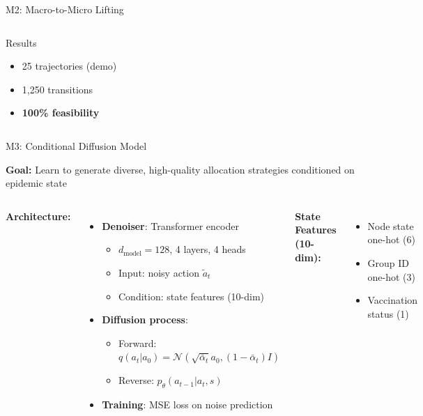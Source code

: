 \documentclass[aspectratio=169]{beamer}
\begin{document}
\begin{frame}{M2: Macro-to-Micro Lifting}
\begin{columns}
\vspace{0.5em}
\begin{block}{Results}
\begin{itemize}
    \item 25 trajectories (demo)
    \item 1,250 transitions
    \item \textbf{100\% feasibility}
\end{itemize}
\end{block}

\end{columns}

\end{frame}

\begin{frame}{M3: Conditional Diffusion Model}

\textbf{Goal:} Learn to generate diverse, high-quality allocation strategies conditioned on epidemic state

\begin{columns}

\textbf{Architecture:}
\begin{itemize}
    \item \textbf{Denoiser}: Transformer encoder
    \begin{itemize}
        \item $d_{\text{model}} = 128$, 4 layers, 4 heads
        \item Input: noisy action $\tilde{a}_t$
        \item Condition: state features (10-dim)
    \end{itemize}
    \item \textbf{Diffusion process}:
    \begin{itemize}
        \item Forward: $q(a_t | a_0) = \mathcal{N}(\sqrt{\bar{\alpha}_t} a_0, (1-\bar{\alpha}_t)I)$
        \item Reverse: $p_\theta(a_{t-1}|a_t, s)$
    \end{itemize}
    \item \textbf{Training}: MSE loss on noise prediction
\end{itemize}

\vspace{0.5em}
\textbf{State Features (10-dim):}
\begin{itemize}
    \item Node state one-hot (6)
    \item Group ID one-hot (3)
    \item Vaccination status (1)
\end{itemize}


\end{columns}
\end{frame}
\end{document}
